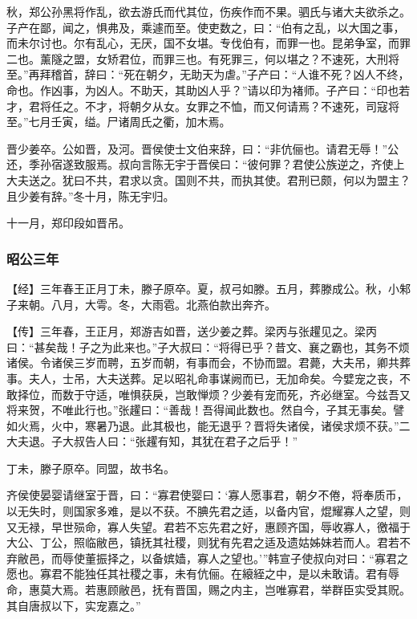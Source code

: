 \documentclass[]{article}
\begin{document}
秋，郑公孙黑将作乱，欲去游氏而代其位，伤疾作而不果。驷氏与诸大夫欲杀之。子产在鄙，闻之，惧弗及，乘遽而至。使吏数之，曰：``伯有之乱，以大国之事，而未尔讨也。尔有乱心，无厌，国不女堪。专伐伯有，而罪一也。昆弟争室，而罪二也。薰隧之盟，女矫君位，而罪三也。有死罪三，何以堪之？不速死，大刑将至。''再拜稽首，辞曰：``死在朝夕，无助天为虐。''子产曰：``人谁不死？凶人不终，命也。作凶事，为凶人。不助天，其助凶人乎？''请以印为褚师。子产曰：``印也若才，君将任之。不才，将朝夕从女。女罪之不恤，而又何请焉？不速死，司寇将至。''七月壬寅，缢。尸诸周氏之衢，加木焉。

晋少姜卒。公如晋，及河。晋侯使士文伯来辞，曰：``非伉俪也。请君无辱！''公还，季孙宿遂致服焉。叔向言陈无宇于晋侯曰：``彼何罪？君使公族逆之，齐使上大夫送之。犹曰不共，君求以贪。国则不共，而执其使。君刑已颇，何以为盟主？且少姜有辞。''冬十月，陈无宇归。

十一月，郑印段如晋吊。

\hypertarget{header-n2397}{%
\subsubsection{昭公三年}\label{header-n2397}}

【经】三年春王正月丁未，滕子原卒。夏，叔弓如滕。五月，葬滕成公。秋，小邾子来朝。八月，大雩。冬，大雨雹。北燕伯款出奔齐。

【传】三年春，王正月，郑游吉如晋，送少姜之葬。梁丙与张趯见之。梁丙曰：``甚矣哉！子之为此来也。''子大叔曰：``将得已乎？昔文、襄之霸也，其务不烦诸侯。令诸侯三岁而聘，五岁而朝，有事而会，不协而盟。君薨，大夫吊，卿共葬事。夫人，士吊，大夫送葬。足以昭礼命事谋阙而已，无加命矣。今嬖宠之丧，不敢择位，而数于守适，唯惧获戾，岂敢惮烦？少姜有宠而死，齐必继室。今兹吾又将来贺，不唯此行也。''张趯曰：``善哉！吾得闻此数也。然自今，子其无事矣。譬如火焉，火中，寒暑乃退。此其极也，能无退乎？晋将失诸侯，诸侯求烦不获。''二大夫退。子大叔告人曰：``张趯有知，其犹在君子之后乎！''

丁未，滕子原卒。同盟，故书名。

齐侯使晏婴请继室于晋，曰：``寡君使婴曰：`寡人愿事君，朝夕不倦，将奉质币，以无失时，则国家多难，是以不获。不腆先君之适，以备内官，焜耀寡人之望，则又无禄，早世殒命，寡人失望。君若不忘先君之好，惠顾齐国，辱收寡人，徼福于大公、丁公，照临敝邑，镇抚其社稷，则犹有先君之适及遗姑姊妹若而人。君若不弃敝邑，而辱使董振择之，以备嫔嫱，寡人之望也。'''韩宣子使叔向对曰：``寡君之愿也。寡君不能独任其社稷之事，未有伉俪。在縗絰之中，是以未敢请。君有辱命，惠莫大焉。若惠顾敝邑，抚有晋国，赐之内主，岂唯寡君，举群臣实受其贶。其自唐叔以下，实宠嘉之。''
\end{document}
